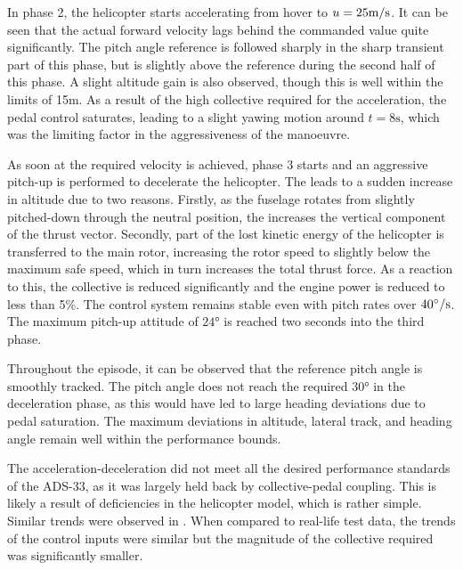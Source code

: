 In phase 2, the helicopter starts accelerating from hover to $u=25\si[per-mode=symbol]{\meter \per \second}$. It can be seen that the actual forward velocity lags behind the commanded value quite significantly. The pitch angle reference is followed sharply in the sharp transient part of this phase, but is slightly above the reference during the second half of this phase. A slight altitude gain is also observed, though this is well within the limits of 15m. As a result of the high collective required for the acceleration, the pedal control saturates, leading to a slight yawing motion around $t = 8 \si{\second}$, which was the limiting factor in the aggressiveness of the manoeuvre. 

As soon at the required velocity is achieved, phase 3 starts and an aggressive pitch-up is performed to decelerate the helicopter. The leads to a sudden increase in altitude due to two reasons. Firstly, as the fuselage rotates from slightly pitched-down through the neutral position, the increases the vertical component of the thrust vector. Secondly, part of the lost kinetic energy of the helicopter is transferred to the main rotor, increasing the rotor speed to slightly below the maximum safe speed, which in turn increases the total thrust force. As a reaction to this, the collective is reduced significantly and the engine power is reduced to less than 5\%. The control system remains stable even with pitch rates over $40\si[per-mode=symbol]{\degree \per \second}$. The maximum pitch-up attitude of $24\si{\degree}$ is reached two seconds into the third phase. 

Throughout the episode, it can be observed that the reference pitch angle is smoothly tracked. The pitch angle does not reach the required $30\si{\degree}$ in the deceleration phase, as this would have led to large heading deviations due to pedal saturation. The maximum deviations in altitude, lateral track, and heading angle remain well within the performance bounds. 

The acceleration-deceleration did not meet all the desired performance standards of the ADS-33, as it was largely held back by collective-pedal coupling. This is likely a result of deficiencies in the helicopter model, which is rather simple. Similar trends were observed in \cite{VanDerVorst2001}. When compared to real-life test data, the trends of the control inputs were similar but the magnitude of the collective required was significantly smaller. 

